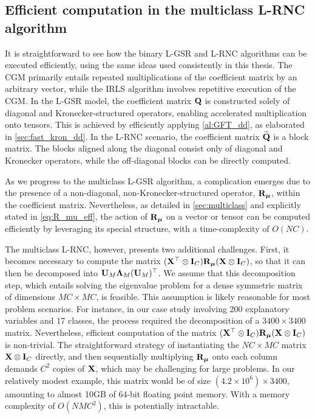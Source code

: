 \subsection{Efficient computation in the multiclass L-RNC algorithm}

It is straightforward to see how the binary L-GSR and L-RNC algorithms can be executed efficiently, using the same ideas used consistently in this thesis. The CGM primarily entails repeated multiplications of the coefficient matrix by an arbitrary vector, while the IRLS algorithm involves repetitive execution of the CGM. In the L-GSR model, the coefficient matrix $\mathbf{Q}$ is constructed solely of diagonal and Kronecker-structured operators, enabling accelerated multiplication onto tensors. This is achieved by efficiently applying \cref{al:GFT_dd}, as elaborated in \cref{sec:fast_kron_dd}. In the L-RNC scenario, the coefficient matrix $\widetilde{\mathbf{Q}}$ is a block matrix. The blocks aligned along the diagonal consist only of diagonal and Kronecker operators, while the off-diagonal blocks can be directly computed.

As we progress to the multiclass L-GSR algorithm, a complication emerges due to the presence of a non-diagonal, non-Kronecker-structured operator, $\mathbf{R}_{\boldsymbol{\mu}}$, within the coefficient matrix. Nevertheless, as detailed in \cref{sec:multiclass} and explicitly stated in \cref{eq:R_mu_eff}, the action of $\mathbf{R}_{\boldsymbol{\mu}}$ on a vector or tensor can be computed efficiently by leveraging its special structure, with a time-complexity of $O(NC)$. 

The multiclass L-RNC, however, presents two additional challenges. First, it becomes necessary to compute the matrix $(\mathbf{X}^\top \otimes \mathbf{I}_C) \mathbf{R}_{\boldsymbol{\mu}} (\mathbf{X} \otimes \mathbf{I}_C)$, so that it can then be decomposed into $\mathbf{U}_M \mathbf{\Lambda}_M (\mathbf{U}_M )^\top$. We assume that this decomposition step, which entails solving the eigenvalue problem for a dense symmetric matrix of dimensions $MC \times MC$, is feasible. This assumption is likely reasonable for most problem scenarios. For instance, in our case study involving 200 explanatory variables and 17 classes, the process required the decomposition of a $3400 \times 3400$ matrix. Nevertheless, efficient computation of the matrix $(\mathbf{X}^\top \otimes \mathbf{I}_C) \mathbf{R}_{\boldsymbol{\mu}} (\mathbf{X} \otimes \mathbf{I}_C)$ is non-trivial. The straightforward strategy of instantiating the $NC \times MC$ matrix $\mathbf{X} \otimes \mathbf{I}_C$ directly, and then sequentially multiplying $\mathbf{R}_{\boldsymbol{\mu}}$ onto each column demands $C^2$ copies of $\mathbf{X}$, which may be challenging for large problems. In our relatively modest example, this matrix would be of size $(4.2 \times 10^6) \times 3400$, amounting to almost 10GB of 64-bit floating point memory. With a memory complexity of $O(NMC^2)$, this is potentially intractable. 

